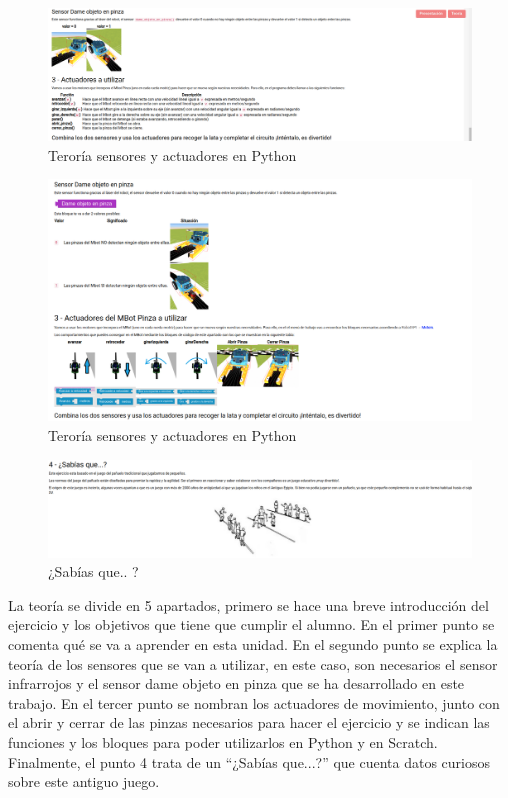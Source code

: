 \begin{figure}[H]
    \centering
    \includegraphics[width=1\textwidth, height=0.4\textwidth]{chapters/images/teoriag4python.png}
    \caption{Teroría sensores y actuadores en Python}
    \label{fig:my_label}
\end{figure}
\begin{figure}[H]
    \centering
    \includegraphics[width=1\textwidth, height=0.4\textwidth]{chapters/images/teoriag4scratch.png}
    \caption{Teroría sensores y actuadores en Python}
    \label{fig:my_label}
\end{figure}
\begin{figure}[H]
    \centering
    \includegraphics[width=1 \textwidth, height=0.27\textwidth]{chapters/images/teoriag5.png}
    \caption{¿Sabías que.. ?}
    \label{fig:my_label}
\end{figure}

La teoría se divide en 5 apartados, primero se hace una breve introducción del ejercicio y los objetivos que tiene que cumplir el alumno. En el primer punto se comenta qué se va a aprender en esta unidad. En el segundo punto se explica la teoría de los sensores que se van a utilizar, en este caso, son necesarios el sensor infrarrojos y el sensor dame objeto en pinza que se ha desarrollado en este trabajo. En el tercer punto se nombran los actuadores de movimiento, junto con  el abrir y cerrar de las pinzas necesarios para hacer el ejercicio y se indican las funciones y los bloques para poder utilizarlos en Python y en Scratch. Finalmente, el punto 4 trata de un ``¿Sabías que...?''  que cuenta datos curiosos sobre este antiguo juego.

